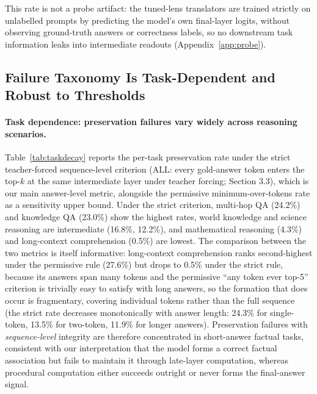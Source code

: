 \documentclass{article} %
\begin{document}
This rate is not a probe artifact: the tuned-lens translators are trained strictly on unlabelled prompts by predicting the model's own final-layer logits, without observing ground-truth answers or correctness labels, so no downstream task information leaks into intermediate readouts (Appendix~\ref{app:probe}).

\subsection{Failure Taxonomy Is Task-Dependent and Robust to Thresholds}
\label{sec:taskdecay}

\paragraph{Task dependence: preservation failures vary widely across reasoning scenarios.}
Table~\ref{tab:taskdecay} reports the per-task preservation rate under the strict teacher-forced sequence-level criterion (ALL: every gold-answer token enters the top-$k$ at the same intermediate layer under teacher forcing; Section 3.3), which is our main answer-level metric, alongside the permissive minimum-over-tokens rate as a sensitivity upper bound. Under the strict criterion, multi-hop QA (24.2\%) and knowledge QA (23.0\%) show the highest rates, world knowledge and science reasoning are intermediate (16.8\%, 12.2\%), and mathematical reasoning (4.3\%) and long-context comprehension (0.5\%) are lowest. The comparison between the two metrics is itself informative: long-context comprehension ranks second-highest under the permissive rule (27.6\%) but drops to 0.5\% under the strict rule, because its answers span many tokens and the permissive ``any token ever top-5'' criterion is trivially easy to satisfy with long answers, so the formation that does occur is fragmentary, covering individual tokens rather than the full sequence (the strict rate decreases monotonically with answer length: 24.3\% for single-token, 13.5\% for two-token, 11.9\% for longer answers). Preservation failures with \emph{sequence-level} integrity are therefore concentrated in short-answer factual tasks, consistent with our interpretation that the model forms a correct factual association but fails to maintain it through late-layer computation, whereas procedural computation either succeeds outright or never forms the final-answer signal.
\end{document}
